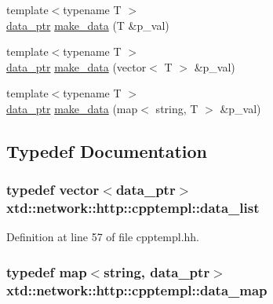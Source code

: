 \begin{DoxyCompactItemize}
\item 
{\footnotesize template$<$typename T $>$ }\\\hyperlink{namespacextd_1_1network_1_1http_1_1cpptempl_ad2f49991f1902699a98cf62bf0ae7ce6}{data\+\_\+ptr} \hyperlink{namespacextd_1_1network_1_1http_1_1cpptempl_a290ac1d88dd4e0bcc65f955fb26e47c8}{make\+\_\+data} (T \&p\+\_\+val)
\item 
{\footnotesize template$<$typename T $>$ }\\\hyperlink{namespacextd_1_1network_1_1http_1_1cpptempl_ad2f49991f1902699a98cf62bf0ae7ce6}{data\+\_\+ptr} \hyperlink{namespacextd_1_1network_1_1http_1_1cpptempl_af97e4f705fc7cb54a179fe88293b2bd7}{make\+\_\+data} (vector$<$ T $>$ \&p\+\_\+val)
\item 
{\footnotesize template$<$typename T $>$ }\\\hyperlink{namespacextd_1_1network_1_1http_1_1cpptempl_ad2f49991f1902699a98cf62bf0ae7ce6}{data\+\_\+ptr} \hyperlink{namespacextd_1_1network_1_1http_1_1cpptempl_a9cfccbb6229825a04791ed3001f6500e}{make\+\_\+data} (map$<$ string, T $>$ \&p\+\_\+val)
\end{DoxyCompactItemize}


\subsection{Typedef Documentation}
\subsubsection[{\texorpdfstring{data\+\_\+list}{data_list}}]{\setlength{\rightskip}{0pt plus 5cm}typedef vector$<${\bf data\+\_\+ptr}$>$ {\bf xtd\+::network\+::http\+::cpptempl\+::data\+\_\+list}}\hypertarget{namespacextd_1_1network_1_1http_1_1cpptempl_aff1b51bcf8064f69c85dd4833c1853b4}{}\label{namespacextd_1_1network_1_1http_1_1cpptempl_aff1b51bcf8064f69c85dd4833c1853b4}


Definition at line 57 of file cpptempl.\+hh.

\subsubsection[{\texorpdfstring{data\+\_\+map}{data_map}}]{\setlength{\rightskip}{0pt plus 5cm}typedef map$<$string, {\bf data\+\_\+ptr}$>$ {\bf xtd\+::network\+::http\+::cpptempl\+::data\+\_\+map}}\hypertarget{namespacextd_1_1network_1_1http_1_1cpptempl_a638d1d81c8fb63c0bbafd508d6a2a007}{}\label{namespacextd_1_1network_1_1http_1_1cpptempl_a638d1d81c8fb63c0bbafd508d6a2a007}


